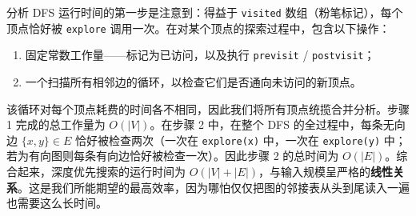 分析 DFS 运行时间的第一步是注意到：得益于 \texttt{visited} 数组（粉笔标记），每个顶点恰好被 \texttt{explore} 调用一次。在对某个顶点的探索过程中，包含以下操作：
\begin{enumerate}
    \item 固定常数工作量——标记为已访问，以及执行 \texttt{previsit} / \texttt{postvisit}；
    \item 一个扫描所有相邻边的循环，以检查它们是否通向未访问的新顶点。
\end{enumerate}
该循环对每个顶点耗费的时间各不相同，因此我们将所有顶点统揽合并分析。步骤 1 完成的总工作量为 $O(|V|)$。在步骤 2 中，在整个 DFS 的全过程中，每条无向边 $\{x, y\} \in E$ 恰好被检查两次（一次在 \texttt{explore(x)} 中，一次在 \texttt{explore(y)} 中；若为有向图则每条有向边恰好被检查一次）。因此步骤 2 的总时间为 $O(|E|)$。综合起来，深度优先搜索的运行时间为 $O(|V| + |E|)$，与输入规模呈严格的\textbf{线性关系}。这是我们所能期望的最高效率，因为哪怕仅仅把图的邻接表从头到尾读入一遍也需要这么长时间。

